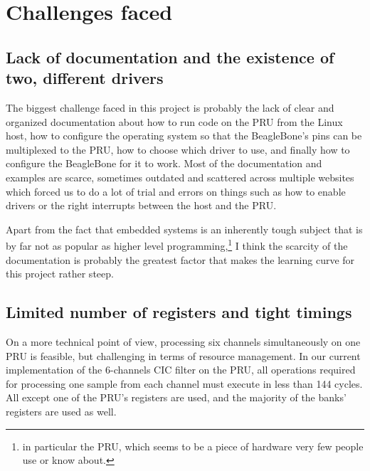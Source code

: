 \documentclass[]{report}
\begin{document}
\hypertarget{challenges-faced}{%
\chapter{Challenges faced}\label{challenges-faced}}

\hypertarget{lack-of-documentation-and-the-existence-of-2-different-drivers}{%
\section{Lack of documentation and the existence of two, different
drivers}\label{lack-of-documentation-and-the-existence-of-2-different-drivers}}

The biggest challenge faced in this project is probably the lack of clear and organized documentation about how to run code on the PRU from the Linux host, how to configure the operating system so that the BeagleBone's pins can be multiplexed to the PRU, how to choose which driver to use, and finally how to configure the BeagleBone for it to work. Most of the documentation and examples are scarce, sometimes outdated and scattered across multiple websites which forced us to do a lot of trial and errors on things such as how to enable drivers or the right interrupts between the host and the PRU.

Apart from the fact that embedded systems is an inherently tough subject that is by far not as popular as higher level programming,\footnote{in particular the PRU, which seems to be a piece of hardware very few people use or know about.} I think the scarcity of the documentation is probably the greatest factor that makes the learning curve for this project rather steep.

\hypertarget{limited-number-of-registers-and-tight-timings}{%
\section{Limited number of registers and tight
timings}\label{limited-number-of-registers-and-tight-timings}}

On a more technical point of view, processing six channels simultaneously on one PRU is feasible, but challenging in terms of resource management. In our current implementation of the 6-channels CIC filter on the PRU, all operations required for processing one sample from each channel must execute in less than 144 cycles. All except one of the PRU's registers are used, and the majority of the banks' registers are used as well.
\end{document}
